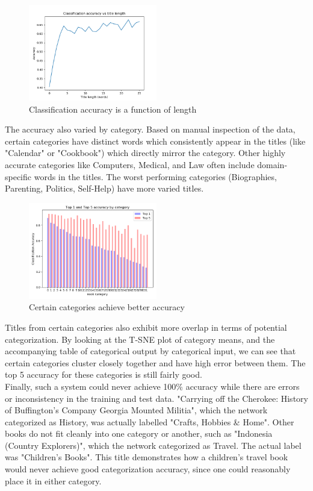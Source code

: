 \documentclass[jou,apacite, 10px]{apa6}
\begin{document}
\begin{figure}[h!]
\captionsetup{justification=centering}
    \centering
        \includegraphics[width=0.5\textwidth]{images/title-length-accuracy-white}
        \caption{Classification accuracy is a function of length}
\end{figure}

The accuracy also varied by category. Based on manual inspection of the data, certain categories have distinct words which consistently appear in the titles (like "Calendar" or "Cookbook") which directly mirror the category. Other highly accurate categories like Computers, Medical, and Law often include domain-specific words in the titles. The worst performing categories (Biographies, Parenting, Politics, Self-Help) have more varied titles.\\

\begin{figure}[h!]
    \captionsetup{justification=centering}
        \centering
            \includegraphics[width=0.5\textwidth]{images/Category_Top1_Top5}
            \caption{Certain categories achieve better accuracy}
    \end{figure}

Titles from certain categories also exhibit more overlap in terms of potential categorization. By looking at the T-SNE plot of category means, and the accompanying table of categorical output by categorical input, we can see that certain categories cluster closely together and have high error between them. The top 5 accuracy for these categories is still fairly good.\\
Finally, such a system could never achieve 100\% accuracy while there are errors or inconsistency in the training and test data. "Carrying off the Cherokee: History of Buffington's Company Georgia Mounted Militia", which the network categorized as History, was actually labelled "Crafts, Hobbies & Home". Other books do not fit cleanly into one category or another, such as "Indonesia (Country Explorers)", which the network categorized as Travel. The actual label was "Children's Books". This title demonstrates how a children's travel book would never achieve good categorization accuracy, since one could reasonably place it in either category.
\end{document}
